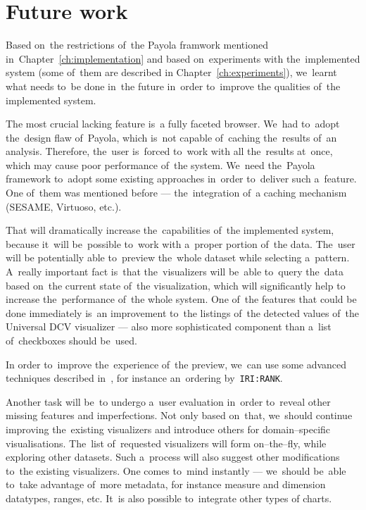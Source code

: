 \chapter{Future work}
\label{ch:future}

Based on~the restrictions of~the Payola framwork mentioned in~Chapter~\ref{ch:implementation}
and based on~experiments with the~implemented system (some of~them are described in
Chapter~\ref{ch:experiments}), we~learnt what needs to~be done in~the future in~order to~improve
the qualities of~the implemented system.

The most crucial lacking feature is~a fully faceted browser. We~had to~adopt the~design flaw of~Payola, which is~not capable of~caching the~results of~an analysis. 
Therefore, the~user is~forced to~work with all the~results at~once, which may 
cause poor performance of~the system. We~need the~Payola framework to~adopt some 
existing approaches in~order to~deliver such a~feature. One of~them was 
mentioned before --- the~integration of~a caching mechanism (SESAME, Virtuoso, etc.).

That will dramatically increase the~capabilities of~the implemented system, 
because it~will be~possible to~work with a~proper portion of~the data. The~user will 
be potentially able to~preview the~whole dataset while selecting a~pattern. A~really important fact is~that the~visualizers will be~able to~query the~data 
based on~the current state of~the visualization, which will significantly help 
to increase the~performance of~the whole system. One of~the features that could 
be done immediately is~an improvement to~the listings of~the detected values of~the 
Universal DCV visualizer --- also more sophisticated component than a~list of~checkboxes should be~used.

In order to~improve the~experience of~the preview, we~can use some advanced 
techniques described in~\cite{faceted-ldow2009}, for instance an~ordering by~\texttt{IRI:RANK}.

Another task will be~to undergo a~user evaluation in~order to~reveal other 
missing features and imperfections. Not only based on~that, we~should continue 
improving the~existing visualizers and introduce others for
domain--specific visualisations. The~list of~requested visualizers will form 
on--the--fly, while exploring other datasets. Such a~process will also suggest 
other modifications to~the existing visualizers. One comes to~mind instantly --- we~should be~able to~take advantage of~more metadata, for instance measure and 
dimension datatypes, ranges, etc. It~is also possible to~integrate other types 
of charts.

